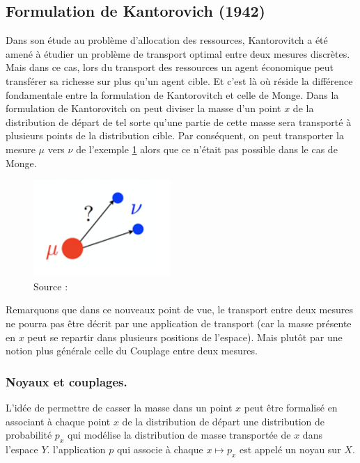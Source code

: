 \documentclass[
    8.2pt,
    a4paper,
    logo,
    twocolumn
]{template}
\begin{document}
    \subsection{Formulation de Kantorovich (1942)}\label{sec:kantorovich}
    Dans son étude au problème d’allocation des ressources, Kantorovitch a été amené à étudier un problème de transport optimal entre deux mesures discrètes. Mais dans ce cas, lors du transport des ressources un agent économique peut transférer sa richesse sur plus qu’un agent cible. Et c’est là où réside la différence fondamentale entre la formulation de Kantorovitch et celle de Monge. Dans la formulation de Kantorovitch on peut diviser la masse d’un point $x$ de la distribution de départ de tel sorte qu’une partie de cette masse sera transporté à plusieurs points de la distribution cible.
    Par conséquent, on peut transporter la mesure $\mu$ vers $\nu$ de l’exemple \ref{fig:update} alors que ce n’était pas possible dans le cas de Monge.
    \begin{figure}[H]
        \centering
        \includegraphics{figures/Image1.png}
        \caption{Source : \citep{flamary_optimal_nodate}}
        \label{fig:update}
    \end{figure}
    Remarquons que dans ce nouveaux point de vue, le transport entre deux mesures ne pourra pas être décrit par une application de transport (car la masse présente en $x$ peut se repartir dans plusieurs positions de l’espace). Mais plutôt par une notion plus générale celle du Couplage entre deux mesures.

    \subsubsection{Noyaux et couplages.}
    L’idée de permettre de casser la masse dans un point $x$ peut être formalisé en associant à chaque point $x$ de la distribution de départ une distribution de probabilité $p_x$ qui modélise la distribution de masse transportée de $x$ dans l’espace $Y$. l’application $p$ qui associe à chaque $x \mapsto p_x$ est appelé un noyau sur $X$.
\end{document}
